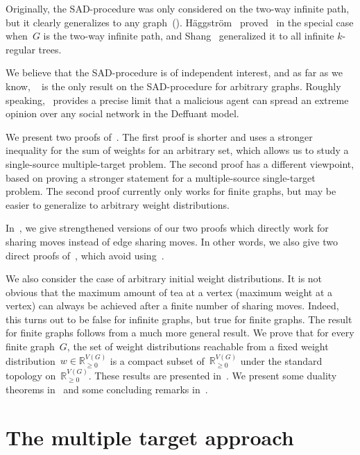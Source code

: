 \documentclass[reqno, 12pt]{amsart}
\numberwithin{equation}{section}
\numberwithin{figure}{section}
\theoremstyle{plain}
\theoremstyle{definition}
\newcommand*{\weights}{\ensuremath{\mathbb{R}_{\geq 0}^{V(G)}}}
\begin{document}
Originally, the SAD-procedure was only considered on the two-way infinite path, but it clearly generalizes to any graph~(\cite{HH2015, HH2019}). 
H\"{a}ggstr\"{o}m~\cite{Haggstrom2012} proved~ in the special case when~$G$ is the two-way infinite path, and Shang~\cite{shang} generalized it to all infinite $k$-regular trees. 

We believe that the SAD-procedure is of independent interest, and as far as we know,
~ is the only result on the SAD-procedure for arbitrary graphs. 
Roughly speaking,~ provides a precise limit that a malicious agent can spread an extreme opinion over any social network in the Deffuant model. 

We present two proofs of~. 
The first proof is shorter and uses a stronger inequality for the sum of weights for an arbitrary set, which allows us to study a single-source multiple-target problem. 
The second proof has a different viewpoint, based on proving a stronger statement for a multiple-source single-target problem. The second proof currently only works for finite graphs, but may be easier to generalize to arbitrary weight distributions. 

In~, we give strengthened versions of our two proofs which directly work for sharing moves instead of edge sharing moves.  In other words, we also give two direct proofs of~, which avoid using~.

We also consider the case of arbitrary initial weight distributions. 
It is not obvious that the maximum amount of tea at a vertex (maximum weight at a vertex) can always be achieved after a finite number of sharing moves. 
Indeed, this turns out to be false for infinite graphs, but true for finite graphs. 
The result for finite graphs follows from a much more general result. 
We prove that for every finite graph~$G$, the set of weight distributions reachable from a fixed weight distribution~${w \in \weights}$ is a compact subset of~$\weights$ under the standard topology on~$\mathbb{R}_{\ge0}^{V(G)}$.
These results are presented in~. 
We present some duality theorems in~ and some concluding remarks in~. 




\section{The multiple target approach}
\label{sec:first}
\end{document}
